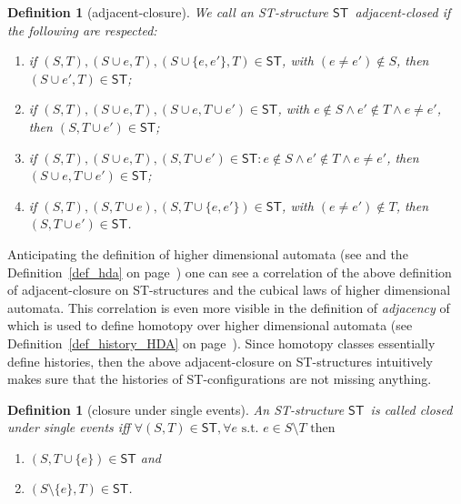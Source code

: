 \documentclass[submission,copyright,creativecommons]{eptcs}
\newtheorem{definition}[theorem]{Definition}
\newcommand\ST{\ensuremath{\mathsf{ST}}}
\newcommand\ststruct{\ensuremath{\ST}}
\begin{document}
\begin{definition}[adjacent-closure]\label{def_adj_ST}
We call an ST-structure \ststruct\ \emph{adja\-cent-closed} if the following are respected:
\begin{enumerate}
  \item if $(S,T),(S\cup e,T),(S\cup\{e,e'\},T)\!\in\!\ststruct$, with $(e\!\neq\!e')\!\not\in\!S$, then $(S\cup e',T)\!\in\!\ststruct$;
  \item if $(S,T),(S\cup e,T),(S\cup e,T\cup e')\!\in\!\ststruct$, with $e\!\not\in\! S\wedge e'\!\not\in\! T\wedge e\!\neq\!e'$, then $(S,T\cup e')\!\in\!\ststruct$;
\item if $(S,T),(S\cup e,T),(S,T\cup e')\!\in\!\ststruct:e\!\not\in\! S\wedge e'\!\not\in\! T\wedge e\!\neq\!e'$, then $(S\cup e,T\cup e')\!\in\!\ststruct$;
  \item if $(S,T),(S,T\cup e),(S,T\cup\{e,e'\})\!\in\!\ststruct$, with $(e\!\neq\!e')\!\not\in\!T$, then $(S,T\cup e')\!\in\!\ststruct$.
\end{enumerate}
\end{definition}

Anticipating the definition of higher dimensional automata (see \cite{pratt91hda,Pratt00HDArev,Glabbeek06HDA} and the Definition~\ref{def_hda} on page~\pageref{def_hda}) one can see a correlation of the above definition of adjacent-closure on ST-structures and the cubical laws of higher dimensional automata. This correlation is even more visible in the definition of \textit{adjacency} of \cite[Def.19]{Glabbeek06HDA} which is used to define homotopy over higher dimensional automata (see Definition~\ref{def_history_HDA} on page~\pageref{def_history_HDA}). Since homotopy classes essentially define histories, then the above adjacent-closure on ST-structures intuitively makes sure that the histories of ST-configurations are not missing anything.



\begin{definition}[closure under single events]\label{def_closeSingleEv}
An ST-structure \ststruct\ is called \emph{closed under single events} 
iff $\forall (S,T)\in\ststruct,\forall e \mbox{ s.t. }e\in S\setminus T \mbox{ then }$
\begin{enumerate}
\item $(S,T\cup\{e\})\in\ststruct$ and
\item $(S\setminus\{e\},T)\in\ststruct$.
\end{enumerate}
\end{definition}
\end{document}
